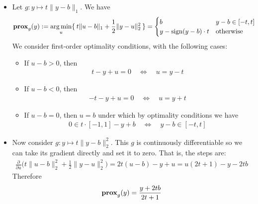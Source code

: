 \documentclass{article}
\theoremstyle{definition}
\theoremstyle{remark}
\begin{document}
\begin{itemize}[leftmargin=*]
    \item Let $ g: y \mapsto t \| y - b \|_1$. We have
    \begin{align*}
        \operatorname{\mathbf{prox}}_{g}(y) &:= \operatorname*{{arg\,min}}_u \{ \: t \| u - b \|_1 + \frac{1}{2} \| y - u \|^2_2 \: \} =
        \begin{cases}
            b & y - b \in [-t, t] \\
            y - \text{sign}(y-b) \cdot t &\text{otherwise}
        \end{cases}
    \end{align*}
    We consider first-order optimality conditions, with the following cases:
    \begin{itemize}
        \item If $u - b > 0$, then 
        \begin{align*}
            t - y + u = 0 \quad \Leftrightarrow \quad u = y - t
        \end{align*}
        \item If $u - b < 0$, then 
        \begin{align*}
            -t - y + u = 0 \quad \Leftrightarrow \quad u = y + t
        \end{align*}
        \item If $u - b = 0$, then $u = b$ under which by optimality conditions we have
        \begin{align*}
            0 \in t \cdot [-1, 1] - y + b \quad \Leftrightarrow \quad y - b \in [-t, t]
        \end{align*}
    \end{itemize}

    \smallskip

    \item Now consider $g: y \mapsto t \| y - b \|_2^2$. This $g$ is continuously differentiable so we can take its gradient directly and set it to zero. That is, the steps are:
    \begin{align*}
        \frac{\partial}{\partial u} \bigg( t \| u - b \|_2^2 + \frac{1}{2}\|y - u \|_2^2 \bigg) = 2 t (u - b) - y + u = u(2t + 1) - y - 2tb
    \end{align*}
    Therefore
    $$
    \operatorname{\mathbf{prox}}_{g}(y) = \frac{y + 2tb}{2 t + 1}
    $$
    \smallskip


\end{itemize}
\end{document}
